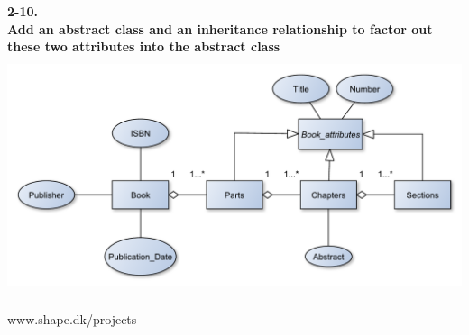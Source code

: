 \documentclass[12pt]{article}
\begin{document}
\textbf{2-10.}\\
\textbf{Add an abstract class and an inheritance relationship to factor out these two attributes into the abstract class}\\

\includegraphics[height=70mm]{2-10}











\newpage

\begin{thebibliography}{9}

  www.shape.dk/projects

\end{thebibliography}
\end{document}

